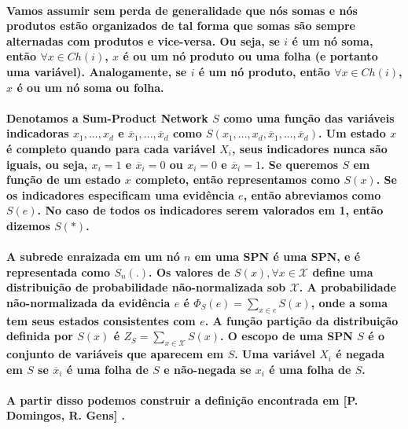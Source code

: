 \documentclass[a4paper,10pt]{article}
\theoremstyle{plain}
\begin{document}
\paragraph{
  Vamos assumir sem perda de generalidade que nós somas e nós produtos estão organizados de tal
  forma que somas são sempre alternadas com produtos e vice-versa. Ou seja, se $i$ é um nó soma,
  então $\forall x \in Ch(i)$, $x$ é ou um nó produto ou uma folha (e portanto uma variável).
  Analogamente, se $i$ é um nó produto, então $\forall x \in Ch(i)$, $x$ é ou um nó soma ou folha.
}

\paragraph{
  Denotamos a Sum-Product Network $S$ como uma função das variáveis indicadoras $x_1,...,x_d$ e
  $\overline{x}_1,...,\overline{x}_d$ como $S(x_1,...,x_d,\overline{x}_1,...,\overline{x}_d)$. Um
  estado $x$ é completo quando para cada variável $X_i$, seus indicadores nunca são iguais, ou
  seja, $x_i=1$ e $\overline{x}_i=0$ ou $x_i=0$ e $\overline{x}_i=1$. Se queremos $S$ em função
  de um estado $x$ completo, então representamos como $S(x)$. Se os indicadores especificam uma
  evidência\cite{project-def} $e$, então abreviamos como $S(e)$. No caso de todos os indicadores
  serem valorados em 1, então dizemos $S(*)$.
}

\paragraph{
  A subrede enraizada em um nó $n$ em uma SPN é uma SPN, e é representada como $S_n(.)$. Os valores
  de $S(x), \forall x \in \mathcal{X}$ define uma distribuição de probabilidade não-normalizada sob
  $\mathcal{X}$. A probabilidade não-normalizada da evidência $e$ é $\Phi_S(e)=\sum_{x \in e}S(x)$,
  onde a soma tem seus estados consistentes\cite{report-1} com $e$. A função partição da
  distribuição definida por $S(x)$ é $Z_S = \sum_{x \in \mathcal{X}} S(x)$. O escopo
  \cite{project-def} de uma SPN $S$ é o conjunto de variáveis que aparecem em $S$. Uma variável
  $X_i$ é negada em $S$ se $\overline{x}_i$ é uma folha de $S$ e não-negada se $x_i$ é uma folha de
  $S$.
}

\paragraph{
  A partir disso podemos construir a definição encontrada em [P. Domingos, R. Gens]
  \cite{gens-domingos}.
}
\end{document}
